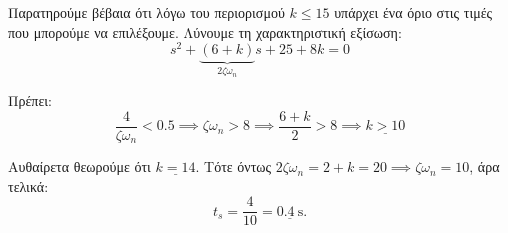 \documentclass[11pt,a4paper,notitlepage,fleqn,final]{article}
\begin{document}
\begin{exercise}
\begin{enumlatin}

Παρατηρούμε βέβαια ότι λόγω του περιορισμού \( k \leq 15 \) υπάρχει ένα όριο στις
τιμές που μπορούμε να επιλέξουμε. Λύνουμε τη χαρακτηριστική εξίσωση:
\[
s^2 + \underbrace{(6+k)}_{2ζ\omega_n}s+25+8k = 0
\]

Πρέπει:
\[
\frac{4}{ζ\omega_n} < 0.5 \implies ζ\omega_n > 8
\implies \frac{6+k}{2} > 8 \implies \underline{k > 10}
\]

Αυθαίρετα θεωρούμε ότι \( \underline{k=14} \). Τότε όντως \( 2ζ\omega_n = 2+k=20 \implies
ζ\omega_n = 10 \), άρα τελικά:
\[
t_s = \frac{4}{10} = \underline{\SI{0.4}{\second}}.
\]

\end{enumlatin}

\hspace{0pt}

\end{exercise}
\end{document}
